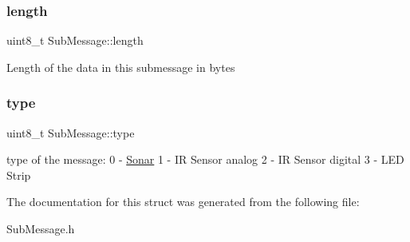 \subsubsection{\texorpdfstring{length}{length}}
{\footnotesize\ttfamily uint8\+\_\+t Sub\+Message\+::length}

Length of the data in this submessage in bytes \mbox{\label{struct_sub_message_a064f1d26d553da776dc749d37a18a499}} 
\subsubsection{\texorpdfstring{type}{type}}
{\footnotesize\ttfamily uint8\+\_\+t Sub\+Message\+::type}

type of the message\+: 0 -\/ \hyperlink{class_sonar}{Sonar} 1 -\/ IR Sensor analog 2 -\/ IR Sensor digital 3 -\/ L\+ED Strip 

The documentation for this struct was generated from the following file\+:\begin{DoxyCompactItemize}
\item 
Sub\+Message.\+h\end{DoxyCompactItemize}

